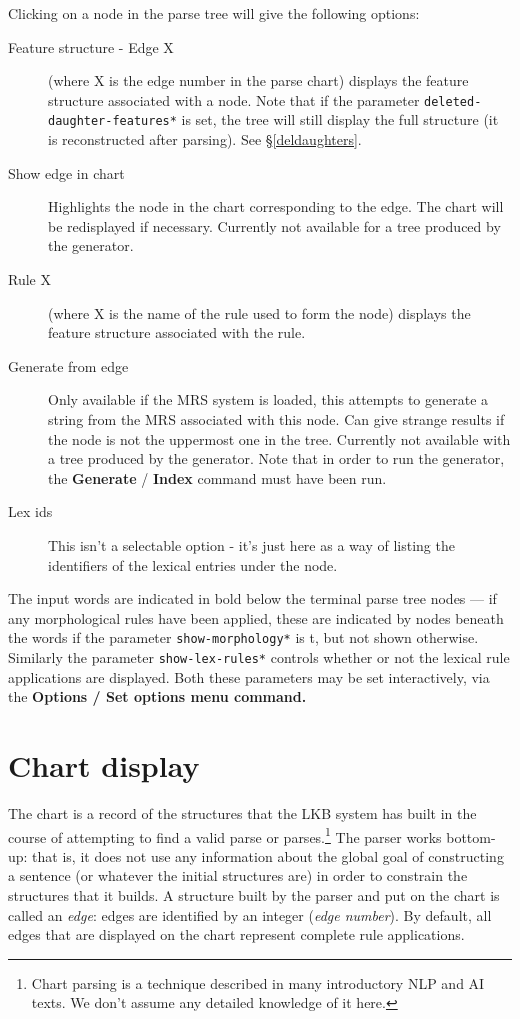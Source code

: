 \documentclass[12pt]{report}
\newcommand{\lkbparam}[1]{{\tt #1}}
\newcommand{\lkbmenucommand}{\bf}
\newcommand{\newterm}[1]{{\it #1}}
\begin{document}
Clicking on a node in the parse tree will
give the following options:
\begin{description}
\item [Feature structure - Edge X]  (where X is the edge number in the
parse chart) displays the feature structure associated
with a node.  Note that if the parameter
\lkbparam{*deleted-daughter-features*} is set, the tree will still
display the full structure (it is reconstructed after parsing).
See \S\ref{deldaughters}.
\item [Show edge in chart] Highlights the node in the chart corresponding to
the edge.  The chart will be redisplayed if necessary.
Currently not available for a tree produced by the generator.
\item [Rule X] (where X is the name of the
rule used to form the node) 
displays the feature structure associated with the rule.
\item[Generate from edge]  Only available if the MRS system
is loaded, this attempts to generate a string from the 
MRS associated with this node.  Can give strange results
if the node is not the uppermost one in the tree.
Currently not available with a tree produced by the generator.
Note that
in order to run the generator, 
the {\lkbmenucommand Generate} / {\lkbmenucommand Index}
command must have been run.
\item[Lex ids] This isn't a selectable option - it's just
here as a way of listing
the identifiers of the lexical entries under the node.
\end{description}

The input words are 
indicated in bold below the terminal parse tree nodes --- if any morphological
rules have been applied, these are indicated by nodes beneath the words
if the parameter \lkbparam{*show-morphology*} is t, but not shown otherwise.
Similarly the parameter \lkbparam{*show-lex-rules*} controls whether or
not the lexical rule applications are displayed.  Both these parameters
may be set interactively, via the 
\lkbmenucommand{Options} / \lkbmenucommand{Set options} 
menu command.

\section{Chart display}
\label{chart}

The chart is a record of the structures that the LKB system has built in
the course of attempting to find a valid parse or parses.\footnote{Chart
parsing is a technique
described in many introductory NLP and AI texts.  We don't assume any
detailed knowledge of it here.}
The parser works bottom-up: that is, it does not use any
information about the global goal of constructing a sentence (or
whatever the initial structures 
are) in order to constrain the structures that it
builds.  A structure built by the parser and put on the
chart is called an \newterm{edge}: edges are identified by an
integer (\newterm{edge number}).
By default, all edges that are displayed on the chart 
represent complete rule applications.
\end{document}
